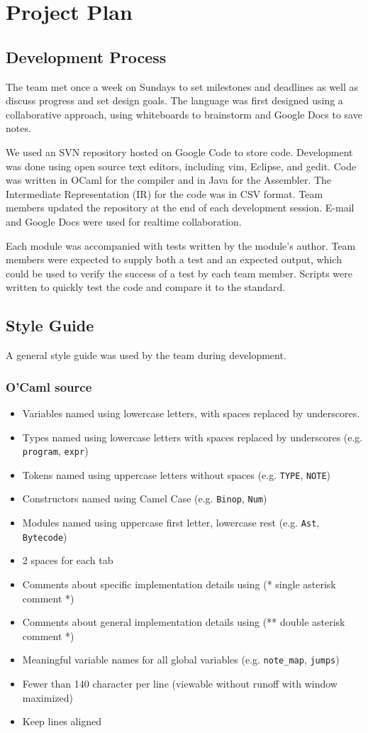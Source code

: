 \documentclass[12pt,A4]{book}
\begin{document}
\chapter{Project Plan}
\section{Development Process}
The team met once a week on Sundays to set milestones and deadlines as well as discuss progress and set design goals. The language was first designed using a collaborative approach, using whiteboards to brainstorm and Google Docs to save notes.

We used an SVN repository hosted on Google Code to store code. Development was done using open source text editors, including vim, Eclipse, and gedit. Code was written in OCaml for the compiler and in Java for the Assembler. The Intermediate Representation (IR) for the code was in CSV format. Team members updated the repository at the end of each development session. E-mail and Google Docs were used for realtime collaboration.

Each module was accompanied with tests written by the module's author. Team members were expected to supply both a test and an expected output, which could be used to verify the success of a test by each team member. Scripts were written to quickly test the code and compare it to the standard.
\section{Style Guide}
A general style guide was used by the team during development.
\subsection{O'Caml source}
\begin{itemize}
\item Variables named using lowercase letters, with spaces replaced by underscores.
\item Types named using lowercase letters with spaces replaced by underscores (e.g. \verb|program|, \verb|expr|)
\item Tokens named using uppercase letters without spaces (e.g. \verb|TYPE|, \verb|NOTE|)
\item Constructors named using Camel Case (e.g. \verb|Binop|, \verb|Num|)
\item Modules named using uppercase first letter, lowercase rest (e.g. \verb|Ast|, \verb|Bytecode|)
\item 2 spaces for each tab
\item Comments about specific implementation details using (* single asterisk comment *)
\item Comments about general implementation details using (** double asterisk comment *)
\item Meaningful variable names for all global variables (e.g. \verb|note_map|, \verb|jumps|)
\item Fewer than 140 character per line (viewable without runoff with window maximized)
\item Keep lines aligned
\end{itemize}
\end{document}
